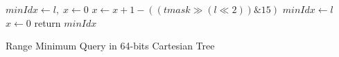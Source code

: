\begin{algorithm}[!thb]
\SetAlgoNoLine
{}
    
$\textit{minIdx} \gets l, \; x \gets 0$ \;
 {
  $x \gets x+1 - ((\textit{tmask} \gg (l \ll 2)) \mathrel{\&} 15)$ \;
   {
    $\textit{minIdx} \gets l$ \;
    $x \gets 0$ \;
  }
}
return $\textit{minIdx}$ \;

  \caption{Range Minimum Query in 64-bits Cartesian Tree}
  \label{alg:cartesian64bits-query}
\end{algorithm}